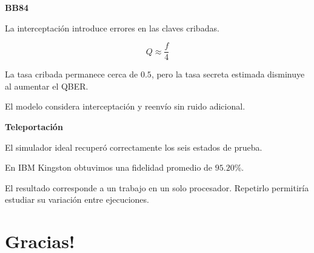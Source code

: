 \documentclass{afitdefense}
\begin{document}
\begin{Center}

\begin{minipage}[t]{0.47\textwidth}
\small

\textbf{BB84}

\medskip

La interceptación introduce errores
en las claves cribadas.

\[
Q \approx \frac{f}{4}
\]

La tasa cribada permanece cerca de $0.5$,
pero la tasa secreta estimada disminuye
al aumentar el QBER.

\medskip

El modelo considera interceptación y reenvío
sin ruido adicional.

\end{minipage}
\hfill
\begin{minipage}[t]{0.47\textwidth}
\small

\textbf{Teleportación}

\medskip

El simulador ideal recuperó correctamente
los seis estados de prueba.

\medskip

En IBM Kingston obtuvimos una fidelidad
promedio de $95.20\%$.

\medskip

El resultado corresponde a un trabajo
en un solo procesador.
Repetirlo permitiría estudiar
su variación entre ejecuciones.

\end{minipage}

\end{Center}


\chapter{Gracias!}
\end{document}
